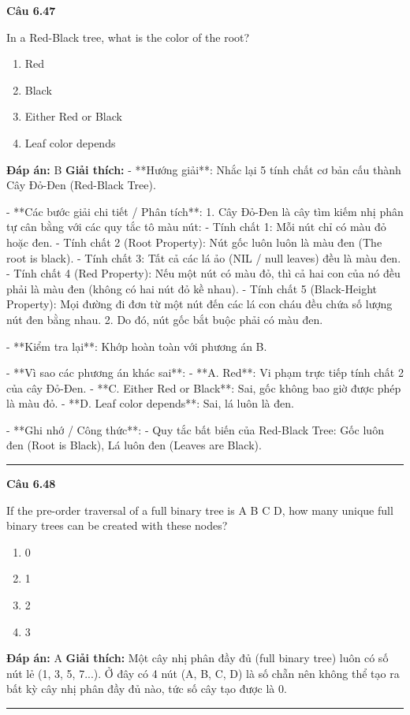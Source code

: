 \documentclass[11pt,a4paper]{article}
\newenvironment{question}[1]{%
  \par\vspace{1em}\noindent\textbf{\large Câu #1}\par\vspace{0.4em}
}{%
  \par\vspace{1em}\hrule\vspace{0.6em}
}
\newenvironment{choices}{%
  \begin{enumerate}[label=\textbf{\Alph*.},leftmargin=2.2em,itemsep=2pt,topsep=3pt]
}{%
  \end{enumerate}
}
\newcommand{\choice}{\item}
\begin{document}
\begin{question}{6.47}
In a Red-Black tree, what is the color of the root?
\begin{choices}
\choice Red
\choice Black
\choice Either Red or Black
\choice Leaf color depends
\end{choices}
\textbf{Đáp án:} B
\textbf{Giải thích:} - **Hướng giải**:
  Nhắc lại 5 tính chất cơ bản cấu thành Cây Đỏ-Đen (Red-Black Tree).

- **Các bước giải chi tiết / Phân tích**:
  1. Cây Đỏ-Đen là cây tìm kiếm nhị phân tự cân bằng với các quy tắc tô màu nút:
     - Tính chất 1: Mỗi nút chỉ có màu đỏ hoặc đen.
     - Tính chất 2 (Root Property): Nút gốc luôn luôn là màu đen (The root is black).
     - Tính chất 3: Tất cả các lá ảo (NIL / null leaves) đều là màu đen.
     - Tính chất 4 (Red Property): Nếu một nút có màu đỏ, thì cả hai con của nó đều phải là màu đen (không có hai nút đỏ kề nhau).
     - Tính chất 5 (Black-Height Property): Mọi đường đi đơn từ một nút đến các lá con cháu đều chứa số lượng nút đen bằng nhau.
  2. Do đó, nút gốc bắt buộc phải có màu đen.

- **Kiểm tra lại**:
  Khớp hoàn toàn với phương án B.

- **Vì sao các phương án khác sai**:
  - **A. Red**: Vi phạm trực tiếp tính chất 2 của cây Đỏ-Đen.
  - **C. Either Red or Black**: Sai, gốc không bao giờ được phép là màu đỏ.
  - **D. Leaf color depends**: Sai, lá luôn là đen.

- **Ghi nhớ / Công thức**:
  - Quy tắc bất biến của Red-Black Tree: Gốc luôn đen (Root is Black), Lá luôn đen (Leaves are Black).
\end{question}

\begin{question}{6.48}
If the pre-order traversal of a full binary tree is A B C D, how many unique full binary trees can be created with these nodes?
\begin{choices}
\choice 0
\choice 1
\choice 2
\choice 3
\end{choices}
\textbf{Đáp án:} A
\textbf{Giải thích:} Một cây nhị phân đầy đủ (full binary tree) luôn có số nút lẻ (1, 3, 5, 7...). Ở đây có 4 nút (A, B, C, D) là số chẵn nên không thể tạo ra bất kỳ cây nhị phân đầy đủ nào, tức số cây tạo được là 0.
\end{question}
\end{document}
